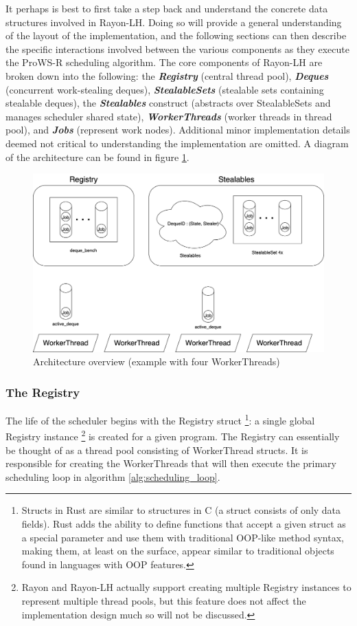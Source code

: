 \documentclass[bsc,frontabs,singlespacing,parskip,deptreport,normalheadings]{infthesis}
\begin{document}
It perhaps is best to first take a step back and understand the concrete data
structures involved in Rayon-LH. Doing so will provide a general understanding
of the layout of the implementation, and the following sections can then
describe the specific interactions involved between the various components as
they execute the ProWS-R scheduling algorithm. The core components of Rayon-LH
are broken down into the following: the \textbf{\textit{Registry}} (central
thread pool), \textbf{\textit{Deques}} (concurrent work-stealing deques),
\textbf{\textit{StealableSets}} (stealable sets containing stealable deques),
the \textbf{\textit{Stealables}} construct (abstracts over StealableSets and
manages scheduler shared state), \textbf{\textit{WorkerThreads}} (worker threads
in thread pool), and \textbf{\textit{Jobs}} (represent work nodes). Additional
minor implementation details deemed not critical to understanding the
implementation are omitted. A diagram of the architecture can be found in figure
\ref{fig:arch}.

\begin{figure}[ht]
    \centering
    \includegraphics[width=0.8\linewidth]{figures/arch.png}
    \caption{Architecture overview (example with four WorkerThreads)}
    \label{fig:arch}
\end{figure}

\subsubsection*{The Registry}

The life of the scheduler begins with the Registry struct \footnote{Structs in
    Rust are similar to structures in C (a struct consists of only data fields).
    Rust adds the ability to define functions that accept a given struct as a
    special parameter and use them with traditional OOP-like method syntax,
    making them, at least on the surface, appear similar to traditional objects
    found in languages with OOP features.}: a single global Registry instance
    \footnote{Rayon and Rayon-LH actually support creating multiple Registry
    instances to represent multiple thread pools, but this feature does not
affect the implementation design much so will not be discussed.} is created for
a given program. The Registry can essentially be thought of as a thread pool
consisting of WorkerThread structs. It is responsible for creating the
WorkerThreads that will then execute the primary scheduling loop in algorithm
\ref{alg:scheduling_loop}.
\end{document}
